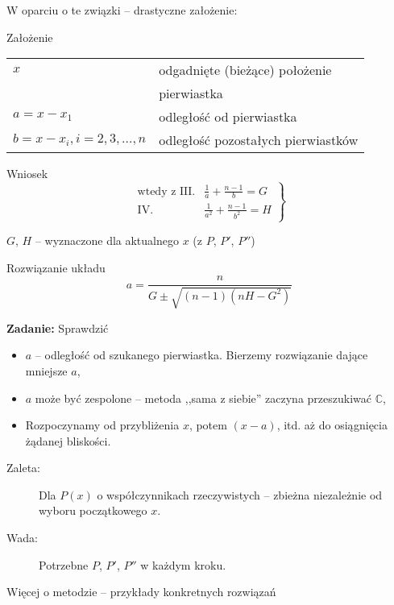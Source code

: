 \begin{frame}
  W oparciu o te związki -- drastyczne założenie:
  \begin{block}{Założenie}
    \begin{tabular}{ll}
      $x$ & odgadnięte (bieżące) położenie \\
      & pierwiastka \\
      $a = x - x_1$ & odległość od pierwiastka \\
      $b = x - x_i, i = 2,3, \dots , n$ & odległość pozostałych pierwiastków
    \end{tabular}
  \end{block}

  \begin{block}{Wniosek}
    $$ \left. \begin{array}{rl}
      \text{wtedy z III.} & \frac{1}{a} + \frac{n - 1}{b} = G \\ %
      \text{IV.} & \frac{1}{a^2} + \frac{n - 1}{b^2} = H
    \end{array} \right\} $$
  \end{block}

$G$, $H$ -- wyznaczone dla aktualnego $x$ (z $P$, $P'$, $P''$)
\end{frame}

\begin{frame}
  \begin{block}{Rozwiązanie układu}
    $$a = \frac{n}{G \pm \sqrt{(n-1)(nH-G^2)}}$$
  \end{block}

  \textbf{Zadanie:} Sprawdzić

  \begin{itemize}
    \item $a$ -- odległość od szukanego pierwiastka. Bierzemy rozwiązanie dające mniejsze $a$,
    \item $a$ może być zespolone -- metoda ,,sama z siebie'' zaczyna przeszukiwać $\mathbb{C}$,
    \item Rozpoczynamy od przybliżenia $x$, potem $(x-a)$, itd. aż do osiągnięcia żądanej bliskości.
  \end{itemize}
\end{frame}

\begin{frame}
  \begin{block}{}
    \begin{description}
      \item[Zaleta:] Dla $P(x)$ o współczynnikach rzeczywistych -- zbieżna niezależnie od wyboru początkowego $x$.
      \item[Wada:] Potrzebne $P$, $P'$, $P''$ w każdym kroku.
    \end{description}
  \end{block}

  Więcej o metodzie -- przykłady konkretnych rozwiązań \cite{Adams}
\end{frame}
